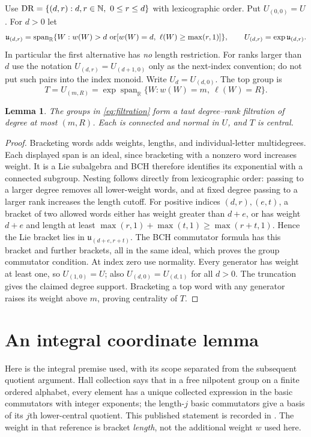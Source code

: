 \documentclass[11pt]{article}
\newtheorem{lemma}[theorem]{Lemma}
\newcommand{\R}{\mathbb R}\newcommand{\Q}{\mathbb Q}
\newcommand{\DR}{\mathrm{DR}}\newcommand{\ee}{\mathrm e}
\newcommand{\lie}{\mathfrak u}\newcommand{\id}{\mathrm{id}}
\begin{document}
Use $\DR=\{(d,r):d,r\in\N,\ 0\leq r\leq d\}$ with lexicographic order.
Put $U_{(0,0)}=U$. For $d>0$ let
\begin{equation}\label{eq:filtration}
 \lie_{(d,r)}=
 \operatorname{span}_{\R}\{W:w(W)>d\ \hbox{or}
 [w(W)=d,\ \ell(W)\geq\max(r,1)]\},
 \qquad U_{(d,r)}=\exp\lie_{(d,r)}.
\end{equation}
In particular the first alternative has \emph{no} length restriction.
For ranks larger than $d$ use the notation $U_{(d,r)}=U_{(d+1,0)}$ only
as the next-index convention; do not put such pairs into the index monoid.
Write $U_d=U_{(d,0)}$. The top group is
\[
 T=U_{(m,R)}=\exp\operatorname{span}_{\R}
       \{W:w(W)=m,\ \ell(W)=R\}.
\]

\begin{lemma}\label{lem:filtration}
The groups in \eqref{eq:filtration} form a taut degree--rank filtration of
degree at most $(m,R)$. Each is connected and normal in $U$, and $T$ is central.
\end{lemma}
\begin{proof}
Bracketing words adds weights, lengths, and individual-letter multidegrees.
Each displayed span is an ideal, since bracketing with a nonzero word increases
weight. It is a Lie subalgebra and BCH therefore identifies its exponential
with a connected subgroup. Nesting follows directly from lexicographic order:
passing to a larger degree removes all lower-weight words, and at fixed degree
passing to a larger rank increases the length cutoff.
For positive indices $(d,r),(e,t)$, a bracket of two allowed words either has
weight greater than $d+e$, or has weight $d+e$ and length at least
$\max(r,1)+\max(t,1)\geq\max(r+t,1)$. Hence the Lie bracket lies in
$\lie_{(d+e,r+t)}$. The BCH commutator formula has this bracket and further
brackets, all in the same ideal, which proves the group commutator condition.
At index zero use normality. Every generator has weight at least one, so
$U_{(1,0)}=U$; also $U_{(d,0)}=U_{(d,1)}$ for all $d>0$.
The truncation gives the claimed degree support. Bracketing a top word with
any generator raises its weight above $m$, proving centrality of $T$.
\end{proof}

\section{An integral coordinate lemma}
Here is the integral premise used, with its scope separated from the subsequent
quotient argument. Hall collection says that in a free nilpotent group on a
finite ordered alphabet, every element has a unique collected expression in
the basic commutators with integer exponents; the length-$j$ basic commutators
give a basis of its $j$th lower-central quotient. This published statement is
recorded in \cite[Definition 5.4.3, Theorem 5.4.5 and the final paragraph
of \S5.4, pp.~96--98]{Tointon}. The weight in that reference is bracket
\emph{length}, not the additional weight $w$ used here.
\end{document}
